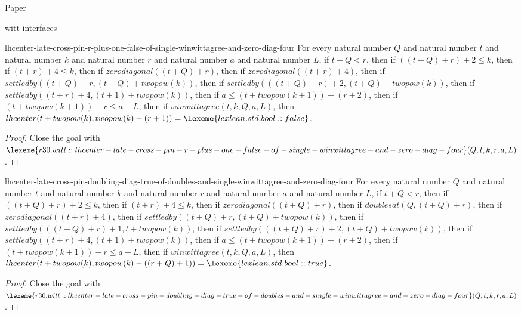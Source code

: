 \begin{lexlean}{Paper}
\begin{section}{witt-interfaces}
  \begin{theorem}{lhcenter-late-cross-pin-r-plus-one-false-of-single-winwittagree-and-zero-diag-four}
  For every natural number \(Q\) and natural number \(t\) and natural number \(k\) and natural number \(r\) and natural number \(a\) and natural number \(L\), if \(t + Q < r\), then if \(((t + Q) + r) + 2 ≤ k\), then if \((t + r) + 4 ≤ k\), then if \(zerodiagonal((t + Q) + r)\), then if \(zerodiagonal((t + r) + 4)\), then if \(settledby((t + Q) + r, (t + Q) + twopow(k))\), then if \(settledby(((t + Q) + r) + 2, (t + Q) + twopow(k))\), then if \(settledby((t + r) + 4, (t + 1) + twopow(k))\), then if \(a ≤ (t + twopow(k + 1)) - (r + 2)\), then if \((t + twopow(k + 1)) - r ≤ a + L\), then if \(winwittagree(t, k, Q, a, L)\), then \(lhcenter(t + twopow(k), twopow(k) - (r + 1)) = \lexeme{lexlean.std.bool::false}\).
  \begin{proof}
  Close the goal with \(\lexeme{r30.witt::lhcenter-late-cross-pin-r-plus-one-false-of-single-winwittagree-and-zero-diag-four}(Q, t, k, r, a, L)\).
  \end{proof}
  \end{theorem}

  \begin{theorem}{lhcenter-late-cross-pin-doubling-diag-true-of-doubles-and-single-winwittagree-and-zero-diag-four}
  For every natural number \(Q\) and natural number \(t\) and natural number \(k\) and natural number \(r\) and natural number \(a\) and natural number \(L\), if \(t + Q < r\), then if \(((t + Q) + r) + 2 ≤ k\), then if \((t + r) + 4 ≤ k\), then if \(zerodiagonal((t + Q) + r)\), then if \(doublesat(Q, (t + Q) + r)\), then if \(zerodiagonal((t + r) + 4)\), then if \(settledby((t + Q) + r, (t + Q) + twopow(k))\), then if \(settledby(((t + Q) + r) + 1, t + twopow(k))\), then if \(settledby(((t + Q) + r) + 2, (t + Q) + twopow(k))\), then if \(settledby((t + r) + 4, (t + 1) + twopow(k))\), then if \(a ≤ (t + twopow(k + 1)) - (r + 2)\), then if \((t + twopow(k + 1)) - r ≤ a + L\), then if \(winwittagree(t, k, Q, a, L)\), then \(lhcenter(t + twopow(k), twopow(k) - ((r + Q) + 1)) = \lexeme{lexlean.std.bool::true}\).
  \begin{proof}
  Close the goal with \(\lexeme{r30.witt::lhcenter-late-cross-pin-doubling-diag-true-of-doubles-and-single-winwittagree-and-zero-diag-four}(Q, t, k, r, a, L)\).
  \end{proof}
  \end{theorem}


\end{section}
\end{lexlean}
